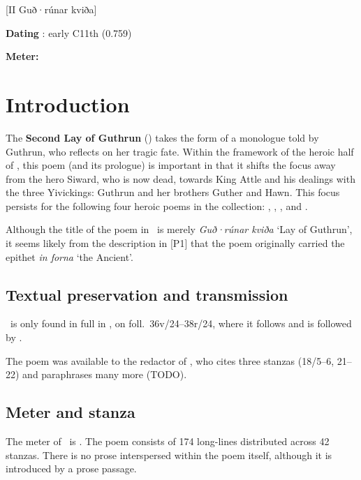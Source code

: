 [II Guð·rúnar kviða]

\begin{flushright}%
\textbf{Dating} \parencite{Sapp2022}: early C11th (0.759)

\textbf{Meter:} \Fornyrdislag%
\end{flushright}

\section{Introduction}

The \textbf{Second Lay of Guthrun} (\GudrunTwo) takes the form of a monologue told by Guthrun, who reflects on her tragic fate.  Within the framework of the heroic half of \Regius, this poem (and its prologue) is important in that it shifts the focus away from the hero Siward, who is now dead, towards King Attle and his dealings with the three Yivickings: Guthrun and her brothers Guther and Hawn.  This focus persists for the following four heroic poems in the collection: , , , and .

Although the title of the poem in \Regius\ is merely \emph{Guð·rúnar kviða} ‘Lay of Guthrun’, it seems likely from the description in [P1] that the poem originally carried the epithet \emph{in forna} ‘the Ancient’.

\subsection{Textual preservation and transmission}

\GudrunTwo\ is only found in full in \Regius, on foll.~36v/24--38r/24, where it follows  and is followed by .

The poem was available to the redactor of \VolsungaSaga, who cites three stanzas (18/5--6, 21--22) and paraphrases many more (TODO).

\subsection{Meter and stanza}

The meter of \GudrunTwo\ is \Fornyrdislag.  The poem consists of 174 long-lines distributed across 42 stanzas.  There is no prose interspersed within the poem itself, although it is introduced by a prose passage.

